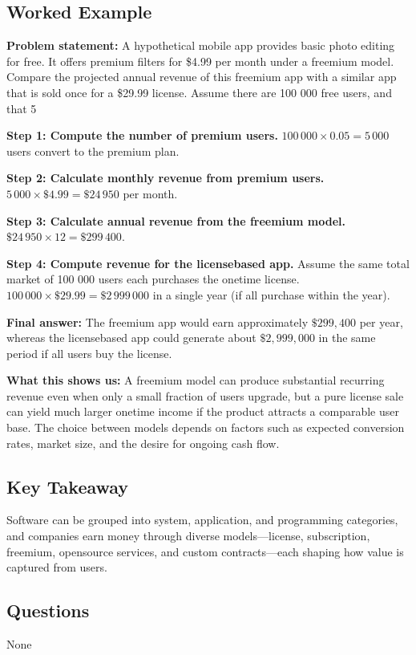 \documentclass[12pt, a4paper]{article}
\begin{document}
\subsection{Worked Example}
\textbf{Problem statement:}  
A hypothetical mobile app provides basic photo editing for free. It offers premium filters for \$4.99 per month under a freemium model. Compare the projected annual revenue of this freemium app with a similar app that is sold once for a \$29.99 license. Assume there are 100 000 free users, and that 5 %

\textbf{Step 1: Compute the number of premium users.}  
\(100\,000 \times 0.05 = 5\,000\) users convert to the premium plan.

\textbf{Step 2: Calculate monthly revenue from premium users.}  
\(5\,000 \times \$4.99 = \$24\,950\) per month.

\textbf{Step 3: Calculate annual revenue from the freemium model.}  
\(\$24\,950 \times 12 = \$299\,400\).

\textbf{Step 4: Compute revenue for the licensebased app.}  
Assume the same total market of 100 000 users each purchases the onetime license.  
\(100\,000 \times \$29.99 = \$2\,999\,000\) in a single year (if all purchase within the year).

\textbf{Final answer:}  
The freemium app would earn approximately \(\$299,400\) per year, whereas the licensebased app could generate about \(\$2,999,000\) in the same period if all users buy the license.

\textbf{What this shows us:}  
A freemium model can produce substantial recurring revenue even when only a small fraction of users upgrade, but a pure license sale can yield much larger onetime income if the product attracts a comparable user base.  The choice between models depends on factors such as expected conversion rates, market size, and the desire for ongoing cash flow.

\subsection{Key Takeaway}
Software can be grouped into system, application, and programming categories, and companies earn money through diverse models---license, subscription, freemium, opensource services, and custom contracts---each shaping how value is captured from users.

\subsection*{Questions}
None
\end{document}
